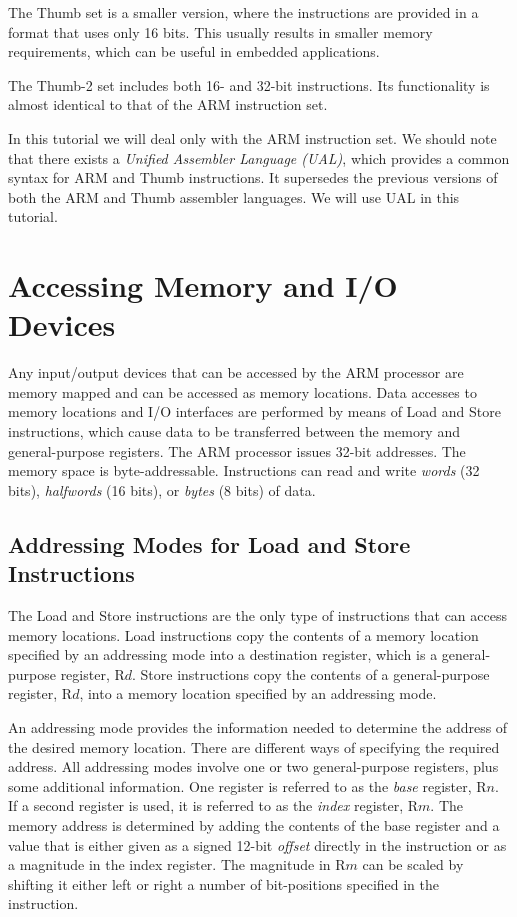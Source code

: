 \documentclass[11pt, twoside, pdftex]{article}
\begin{document}
The Thumb set is a smaller version, where the 
instructions are provided in a format that uses only 16 bits.
This usually results in smaller memory requirements, which can be
useful in embedded applications.

The Thumb-2 set includes both 16- and 32-bit instructions.
Its functionality is almost identical to that of the ARM
instruction set.

In this tutorial we will deal only with the ARM instruction set.
We should note that there exists a {\it Unified Assembler
Language (UAL)}, which provides a common syntax for ARM and
Thumb instructions. It supersedes the previous versions of
both the ARM and Thumb assembler languages. We will use UAL
in this tutorial. 

\section{Accessing Memory and I/O Devices}
\label{sec:mem_IO}

Any input/output devices that can be accessed by the ARM
processor are memory mapped and can be accessed as memory
locations. Data accesses to memory locations and I/O interfaces
are performed by means of Load and Store instructions, which cause data 
to be transferred between the memory and
general-purpose registers.
The ARM processor issues 32-bit addresses. The memory space is byte-addressable. 
Instructions can read and write {\it words} 
(32 bits), {\it halfwords} (16 bits), or {\it bytes} (8 bits) of data.

\subsection{Addressing Modes for Load and Store Instructions}
\label{sec:modes}

The Load and Store instructions are the only type of instructions
that can access memory locations.
Load instructions copy the contents of a memory location
specified by an addressing mode into a destination register,
which is a general-purpose register, R$d$.
Store instructions copy the contents of a general-purpose
register, R$d$, into a memory location specified by an
addressing mode.

An addressing mode provides the information needed to determine the address of the desired memory location. 
There are different ways of specifying the required address. 
All addressing modes involve one or two
general-purpose registers, plus some additional information.
One register is referred to as the {\it base} register, R$n$.
If a second register is used, it is referred to as the
{\it index} register, R$m$. The memory address is determined by
adding the contents of the base register and a value that is
either given as a signed 12-bit {\it offset} directly in the
instruction or as a magnitude in the index register.
The magnitude in R$m$ can be scaled by shifting it either left
or right a number of bit-positions specified in the instruction.
\end{document}
